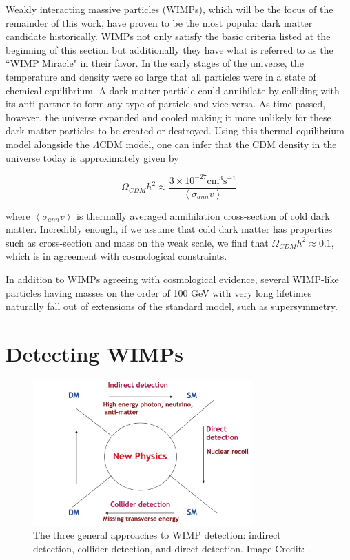 Weakly interacting massive particles (WIMPs), which will be the focus of the remainder of this work, have proven to be the most popular dark matter candidate historically.   WIMPs not only satisfy the basic criteria listed at the beginning of this section but additionally they have what is referred to as the ``WIMP Miracle" in their favor.  In the early stages of the universe, the temperature and density were so large that all particles were in a state of chemical equilibrium.  A dark matter particle could annihilate by colliding with its anti-partner to form any type of particle and vice versa.  As time passed, however, the universe expanded and cooled making it more unlikely for these dark matter particles to be created or destroyed.  Using this thermal equilibrium model alongside the $\Lambda$CDM model, one can infer that the CDM density in the universe today is approximately given by \cite{jungman1996supersymmetric, bertone2010particle}

\begin{equation}
        \Omega_{CDM}h^2 \approx \frac{3 \times 10^{-27} \mathrm{cm}^3  \mathrm{s}^{-1}}{\left< \sigma_{ann} v \right> }
\end{equation}

where $\left< \sigma_{ann} v \right>$ is thermally averaged annihilation cross-section of cold dark matter.  Incredibly enough, if we assume that cold dark matter has properties such as cross-section and mass on the weak scale, we find that $\Omega_{CDM}h^2 \approx 0.1$, which is in agreement with cosmological constraints. 

In addition to WIMPs agreeing with cosmological evidence, several WIMP-like particles having masses on the order of 100 GeV with very long lifetimes naturally fall out of extensions of the standard model, such as supersymmetry.  



\section{Detecting WIMPs}

\begin{figure}[b]
	\centering
	\includegraphics[width=0.75\textwidth]{wimp_detection}
	\caption{The three general approaches to WIMP detection: indirect detection, collider detection, and direct detection.  Image Credit: \cite{bi2013status}.}
	\label{fig:wimp_detection}
\end{figure}

